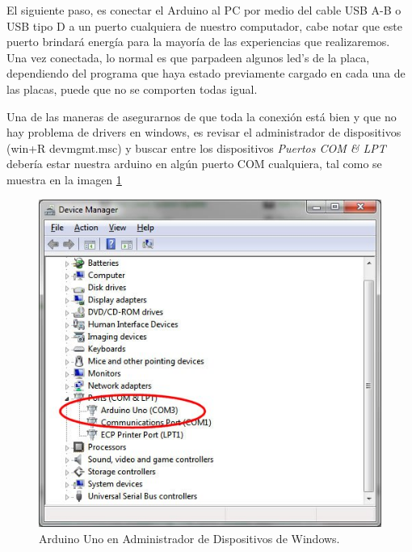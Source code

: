 \documentclass[letterpaper, 10pt]{report}
\begin{document}
El siguiente paso, es conectar el Arduino al PC por medio del cable USB A-B o USB tipo D a un puerto cualquiera de nuestro computador, cabe notar que este puerto brindará energía para la mayoría de las experiencias que realizaremos. Una vez conectada, lo normal es que parpadeen algunos led's de la placa, dependiendo del programa que haya estado previamente cargado en cada una de las placas, puede que no se comporten todas igual.

Una de las maneras de asegurarnos de que toda la conexión está bien y que no hay problema de drivers en windows, es revisar el administrador de dispositivos (win+R devmgmt.msc) y buscar entre los dispositivos \emph{Puertos COM \& LPT} debería estar nuestra arduino en algún puerto COM cualquiera, tal como se muestra en la imagen \ref{debmgr}

\begin{figure}[h]
\centering
\includegraphics[scale=0.4]{device_manager.jpg}
\caption{Arduino Uno en Administrador de Dispositivos de Windows. \label{debmgr}}
\end{figure} 
\end{document}
